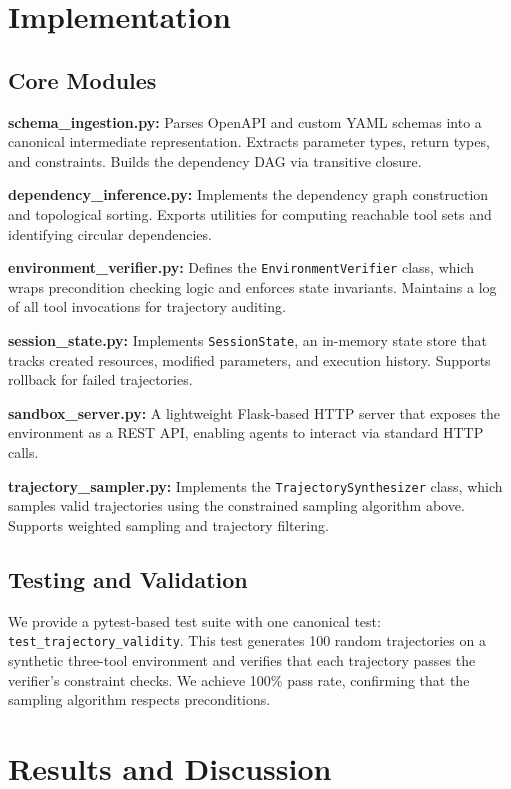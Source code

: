 \documentclass[11pt,a4paper]{article}
\begin{document}
\section{Implementation}

\subsection{Core Modules}

\textbf{schema\_ingestion.py:} Parses OpenAPI and custom YAML schemas into a canonical intermediate representation. Extracts parameter types, return types, and constraints. Builds the dependency DAG via transitive closure.

\textbf{dependency\_inference.py:} Implements the dependency graph construction and topological sorting. Exports utilities for computing reachable tool sets and identifying circular dependencies.

\textbf{environment\_verifier.py:} Defines the \texttt{EnvironmentVerifier} class, which wraps precondition checking logic and enforces state invariants. Maintains a log of all tool invocations for trajectory auditing.

\textbf{session\_state.py:} Implements \texttt{SessionState}, an in-memory state store that tracks created resources, modified parameters, and execution history. Supports rollback for failed trajectories.

\textbf{sandbox\_server.py:} A lightweight Flask-based HTTP server that exposes the environment as a REST API, enabling agents to interact via standard HTTP calls.

\textbf{trajectory\_sampler.py:} Implements the \texttt{TrajectorySynthesizer} class, which samples valid trajectories using the constrained sampling algorithm above. Supports weighted sampling and trajectory filtering.

\subsection{Testing and Validation}

We provide a pytest-based test suite with one canonical test: \texttt{test\_trajectory\_validity}. This test generates 100 random trajectories on a synthetic three-tool environment and verifies that each trajectory passes the verifier's constraint checks. We achieve 100\% pass rate, confirming that the sampling algorithm respects preconditions.

\section{Results and Discussion}
\end{document}
